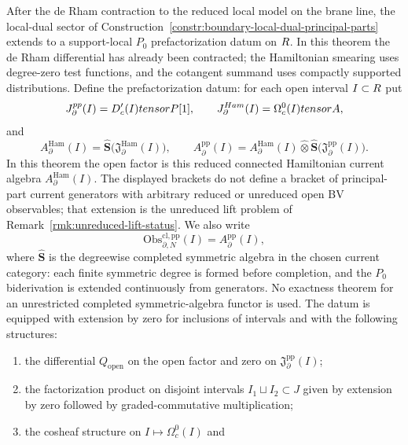 \documentclass[11pt]{memoir}
\begin{document}
\begin{thm}\label{thm:reduced-principal-part-boundary-current}
  After the de Rham contraction to the reduced local model on the brane
  line, the local-dual sector of
  Construction~\ref{constr:boundary-local-dual-principal-parts} extends to
  a support-local \(P_0\) prefactorization datum on \(R\).  In this
  theorem the de Rham differential has already been contracted; the
  Hamiltonian smearing uses degree-zero test functions, and the cotangent
  summand uses compactly supported distributions.  Define the
  prefactorization datum: for each open interval \(I\subset R\) put
	  $$J_{\partial}^{pp}(I)
	    =D'_c(I)tensorP[1],\qquad
	  J_{\partial}^{Ham}(I)
	    =\Omega_c^0(I)tensorA,$$
  and
  \[
    A_{\partial}^{\mathrm{Ham}}(I)
      =\widehat{\mathbf S}\bigl(\mathfrak J_{\partial}^{\mathrm{Ham}}(I)\bigr),
    \qquad
    A_{\partial}^{\mathrm{pp}}(I)
      =
      A_{\partial}^{\mathrm{Ham}}(I)
      \widehat\otimes
      \widehat{\mathbf S}\bigl(\mathfrak J_{\partial}^{\mathrm{pp}}(I)\bigr).
  \]
  In this theorem the open factor is this reduced connected Hamiltonian
  current algebra \(A_{\partial}^{\mathrm{Ham}}(I)\).  The displayed
  brackets do not define a bracket of principal-part current generators
  with arbitrary reduced or unreduced open BV observables; that
  extension is the unreduced lift problem of
  Remark~\ref{rmk:unreduced-lift-status}.  We also write
  $$\mathrm{Obs}_{\partial,N}^{\mathrm{cl,pp}}(I)
    = A_{\partial}^{\mathrm{pp}}(I),$$
  where \(\widehat{\mathbf S}\) is the degreewise completed symmetric
  algebra in the chosen current category: each finite symmetric degree
  is formed before completion, and the \(P_0\) biderivation is extended
  continuously from generators. No exactness theorem for an
  unrestricted completed symmetric-algebra functor is used.
  The datum is equipped with extension by zero for inclusions of
  intervals and with the following structures:
  \begin{enumerate}
    \item the differential $Q_{\mathrm{open}}$ on the open factor and zero
      on $\mathfrak J_{\partial}^{\mathrm{pp}}(I)$;
    \item the factorization product on disjoint intervals
      $I_1\sqcup I_2\subset J$ given by extension by zero followed by
      graded-commutative multiplication;
		    \item the cosheaf structure on \(I\mapsto \Omega_c^0(I)\) and

\end{enumerate}
\end{thm}
\end{document}
